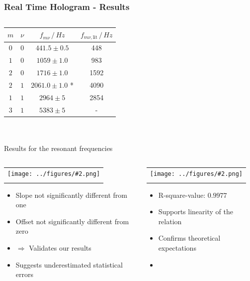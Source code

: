 \documentclass[10pt]{beamer}
\newcommand{\gra}[3][]{
	\begin{table}
	\centering
	\begin{tabular}[width=\textwidth]{c}
		\texttt{[image: ../figures/\#2.png]}\\
		\small #3
	\end{tabular}
	\end{table}
}
\begin{document}
\begin{frame}
	\frametitle{Real Time Hologram - Results}
	\begin{columns}
		\begin{column}{0.6\textwidth}
			\begin{table}
				\centering
				\begin{tabular}{c|c|c|c}
					$m$ & $\nu$ 		& $f_{m\nu}\,/\,\si{Hz}$ 	& $f_{m\nu, \text{lit}}\,/\,\si{Hz}$\\ \hline\hline
					$0$&$0$	& $441.5\pm0.5$					& 448	\\ \hline
					$1$&$0$	& $1059\pm1.0$				& 983	\\ \hline
					$2$&$0$	& $1716\pm1.0$				& 1592	\\ \hline
					$2$&$1$	& $2061.0\pm1.0$ *				& 4090	\\ \hline
					$1$&$1$	& $2964\pm5$				& 2854 \\ \hline
					$3$&$1$	& $5383\pm5$				&-
				\end{tabular}\\\scriptsize\ \\\small
				{Results for the resonant frequencies\footnotemark}
			\end{table}		
		\end{column}
		\pause
	\end{columns}
	\footnotetext{\fullcite{staats}}
\end{frame}

\begin{frame}
	\begin{columns}
	\begin{column}{0.5\textwidth}
		\gra{LinFitResFreq}{}
	\begin{itemize}
		\item Slope not significantly different from one
		\item Offset not significantly different from zero
		\item[]$\Rightarrow$ Validates our results
		\item Suggests underestimated statistical errors
	\end{itemize}
	\end{column}
	\begin{column}{0.5\textwidth}
		\gra{LinFitResFreq1}{}
	\begin{itemize}
		\item R-square-value: $0.9977$
		\item Supports linearity of the relation
		\item Confirms theoretical expectations
		\item[] \ 
	\end{itemize}
	\end{column}
	\end{columns}
\end{frame}
\end{document}
